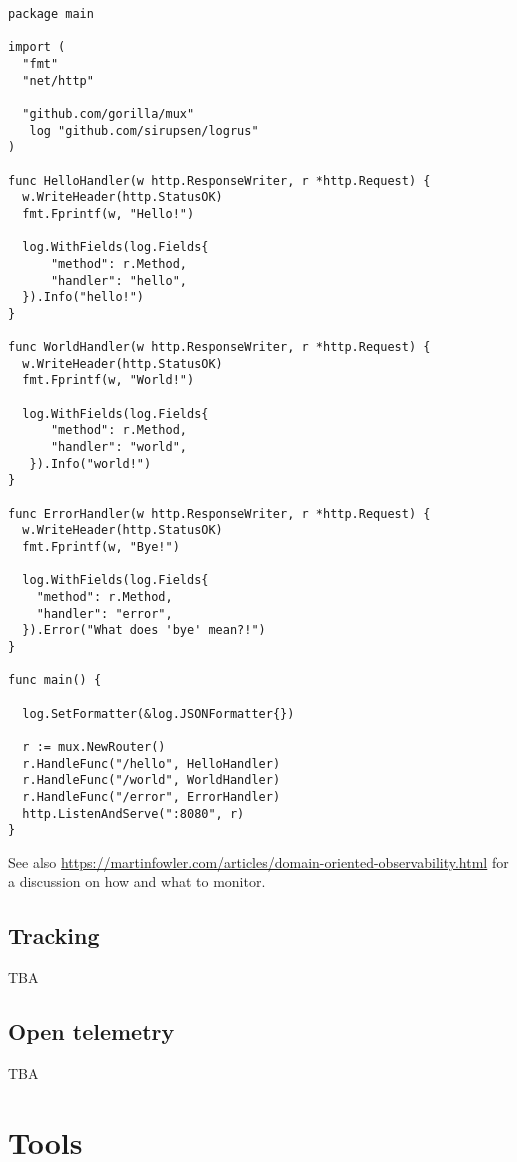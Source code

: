 \documentclass[11pt, letterpaper]{article}
\begin{document}
\begin{verbatim}
package main

import (
  "fmt"
  "net/http"

  "github.com/gorilla/mux"
   log "github.com/sirupsen/logrus"
)

func HelloHandler(w http.ResponseWriter, r *http.Request) {
  w.WriteHeader(http.StatusOK)
  fmt.Fprintf(w, "Hello!")

  log.WithFields(log.Fields{
      "method": r.Method,
      "handler": "hello",
  }).Info("hello!")
}

func WorldHandler(w http.ResponseWriter, r *http.Request) {
  w.WriteHeader(http.StatusOK)
  fmt.Fprintf(w, "World!")

  log.WithFields(log.Fields{
      "method": r.Method,
      "handler": "world",
   }).Info("world!")
}

func ErrorHandler(w http.ResponseWriter, r *http.Request) {
  w.WriteHeader(http.StatusOK)
  fmt.Fprintf(w, "Bye!")

  log.WithFields(log.Fields{
    "method": r.Method,
    "handler": "error",
  }).Error("What does 'bye' mean?!")
}

func main() {

  log.SetFormatter(&log.JSONFormatter{})

  r := mux.NewRouter()
  r.HandleFunc("/hello", HelloHandler)
  r.HandleFunc("/world", WorldHandler)
  r.HandleFunc("/error", ErrorHandler)
  http.ListenAndServe(":8080", r)
}
\end{verbatim}

See also \href{https://martinfowler.com/articles/domain-oriented-observability.html}{https://martinfowler.com/articles/domain-oriented-observability.html} for a discussion on how and what to monitor.

\subsection{Tracking}

TBA

\subsection{Open telemetry}

TBA

\pagebreak
\section{Tools}
\end{document}
